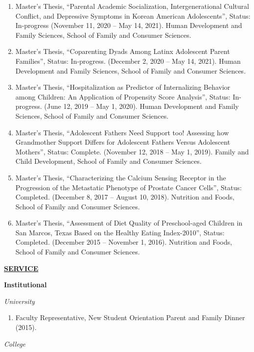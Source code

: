 \documentclass[
]{article}
\providecommand{\tightlist}{%
  \setlength{\itemsep}{0pt}\setlength{\parskip}{0pt}}
\begin{document}
\begin{enumerate}
\def\labelenumi{\arabic{enumi}.}
\item
  Master's Thesis, ``Parental Academic Socialization, Intergenerational
  Cultural Conflict, and Depressive Symptoms in Korean American
  Adolescents'', Status: In-progress (November 11, 2020 -- May 14,
  2021). Human Development and Family Sciences, School of Family and
  Consumer Sciences.
\item
  Master's Thesis, ``Coparenting Dyads Among Latinx Adolescent Parent
  Families'', Status: In-progress. (December 2, 2020 -- May 14, 2021).
  Human Development and Family Sciences, School of Family and Consumer
  Sciences.
\item
  Master's Thesis, ``Hospitalization as Predictor of Internalizing
  Behavior among Children: An Application of Propensity Score
  Analysis'', Status: In-progress. (June 12, 2019 -- May 1, 2020). Human
  Development and Family Sciences, School of Family and Consumer
  Sciences.
\item
  Master's Thesis, ``Adolescent Fathers Need Support too! Assessing how
  Grandmother Support Differs for Adolescent Fathers Versus Adolescent
  Mothers'', Status: Complete. (November 12, 2018 -- May 1, 2019).
  Family and Child Development, School of Family and Consumer Sciences.
\item
  Master's Thesis, ``Characterizing the Calcium Sensing Receptor in the
  Progression of the Metastatic Phenotype of Prostate Cancer Cells'',
  Status: Completed. (December 8, 2017 -- August 10, 2018). Nutrition
  and Foods, School of Family and Consumer Sciences.
\item
  Master's Thesis, ``Assessment of Diet Quality of Preschool-aged
  Children in San Marcos, Texas Based on the Healthy Eating
  Index-2010'', Status: Completed. (December 2015 -- November 1, 2016).
  Nutrition and Foods, School of Family and Consumer Sciences.
\end{enumerate}

\uline{\textbf{SERVICE}}

\textbf{Institutional}

\emph{University}

\begin{enumerate}
\def\labelenumi{\arabic{enumi}.}
\tightlist
\item
  Faculty Representative, New Student Orientation Parent and Family
  Dinner (2015).
\end{enumerate}

\emph{College}
\end{document}
